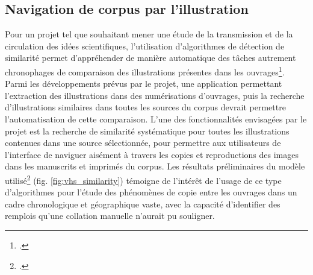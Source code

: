 \subsection{Navigation de corpus par l'illustration}
Pour un projet tel que \vhs souhaitant mener une étude de la transmission et de la circulation des idées scientifiques, l'utilisation d'algorithmes de détection de similarité permet d'appréhender de manière automatique des tâches autrement chronophages de comparaison des illustrations présentes dans les ouvrages\footcite{kaouaImageCollationMatching2021}. Parmi les développements prévus par le projet, une application permettant l'extraction des illustrations dans des numérisations d'ouvrages, puis la recherche d'illustrations similaires dans toutes les sources du corpus devrait permettre l'automatisation de cette comparaison. L'une des fonctionnalités envisagées par le projet est la recherche de similarité systématique pour toutes les illustrations contenues dans une source sélectionnée, pour permettre aux utilisateurs de l'interface de naviguer aisément à travers les copies et reproductions des images dans les manuscrits et imprimés du corpus. Les résultats préliminaires du modèle utilisé\footcite{kaouaImageCollationMatching2021} (fig. \ref{fig:vhs_similarity}) témoigne de l'intérêt de l'usage de ce type d'algorithmes pour l'étude des phénomènes de copie entre les ouvrages dans un cadre chronologique et géographique vaste, avec la capacité d'identifier des remplois qu'une collation manuelle n'aurait pu souligner.


